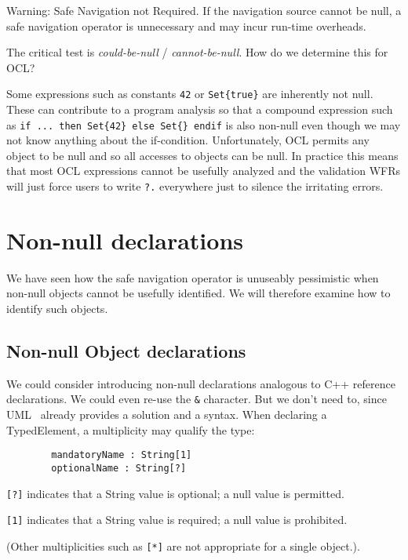 \documentclass{llncs}
\begin{document}
Warning: Safe Navigation not Required. If the navigation source cannot be null, a safe navigation operator is unnecessary and may incur run-time overheads.

The critical test is \emph{could-be-null} / \emph{cannot-be-null}. How do we determine this for OCL?

Some expressions such as constants \verb|42| or \verb|Set{true}| are inherently not null. These can contribute to a program analysis so that a compound expression such as \verb|if ... then Set{42} else Set{} endif| is also non-null even though we may not know anything about the if-condition. Unfortunately, OCL permits any object to be null and so all accesses to objects can be null. In practice this means that most OCL expressions cannot be usefully analyzed and the validation WFRs will just force users to write \verb|?.| everywhere just to silence the irritating errors. 

\section{Non-null declarations}\label{Non-null declarations}

We have seen how the safe navigation operator is unuseably pessimistic when non-null objects cannot be usefully identified. We will therefore examine how to identify such objects. 

\subsection{Non-null Object declarations}

We could consider introducing non-null declarations analogous to C++ reference declarations. We could even re-use the \verb|&| character. But we don't need to, since UML~\cite{UML-2.5} already provides a solution and a syntax. When declaring a TypedElement, a multiplicity may qualify the type:

\begin{verbatim}
        mandatoryName : String[1]
        optionalName : String[?]
\end{verbatim}

\verb|[?]| indicates that a String value is optional; a null value is permitted.

\verb|[1]| indicates that a String value is required; a null value is prohibited.

(Other multiplicities such as \verb|[*]| are not appropriate for a single object.).
\end{document}
